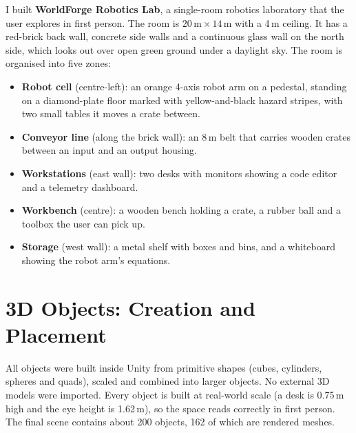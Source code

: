 \documentclass[11pt,a4paper]{article}
\begin{document}
I built \textbf{WorldForge Robotics Lab}, a single-room robotics laboratory that the user explores in first
person. The room is $20\,\text{m} \times 14\,\text{m}$ with a 4\,m ceiling. It has a red-brick back wall, concrete
side walls and a continuous glass wall on the north side, which looks out over open green ground under a
daylight sky. The room is organised into five zones:

\begin{itemize}
  \item \textbf{Robot cell} (centre-left): an orange 4-axis robot arm on a pedestal, standing on a diamond-plate
        floor marked with yellow-and-black hazard stripes, with two small tables it moves a crate between.
  \item \textbf{Conveyor line} (along the brick wall): an 8\,m belt that carries wooden crates between an input
        and an output housing.
  \item \textbf{Workstations} (east wall): two desks with monitors showing a code editor and a telemetry dashboard.
  \item \textbf{Workbench} (centre): a wooden bench holding a crate, a rubber ball and a toolbox the user can pick up.
  \item \textbf{Storage} (west wall): a metal shelf with boxes and bins, and a whiteboard showing the robot arm's equations.
\end{itemize}

\section{3D Objects: Creation and Placement}

All objects were built inside Unity from primitive shapes (cubes, cylinders, spheres and quads), scaled and
combined into larger objects. No external 3D models were imported. Every object is built at real-world scale
(a desk is 0.75\,m high and the eye height is 1.62\,m), so the space reads correctly in first person.
The final scene contains about 200 objects, 162 of which are rendered meshes.
\end{document}
